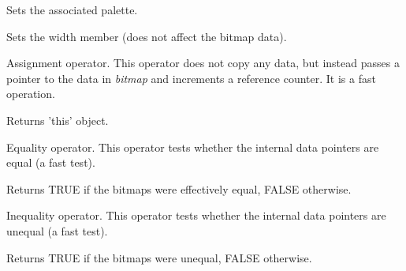 Sets the associated palette.







Sets the width member (does not affect the bitmap data).





Assignment operator. This operator does not copy any data, but instead
passes a pointer to the data in {\it bitmap} and increments a reference
counter. It is a fast operation.




Returns 'this' object.



Equality operator. This operator tests whether the internal data pointers are
equal (a fast test).




Returns TRUE if the bitmaps were effectively equal, FALSE otherwise.



Inequality operator. This operator tests whether the internal data pointers are
unequal (a fast test).




Returns TRUE if the bitmaps were unequal, FALSE otherwise.

